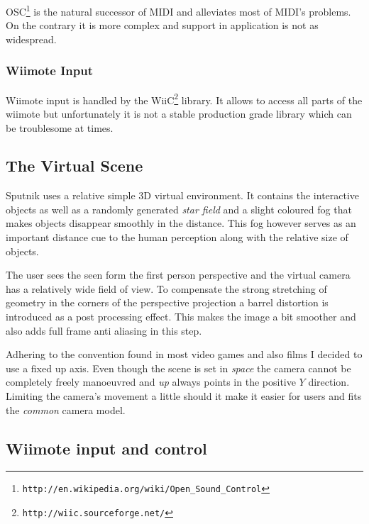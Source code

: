 \documentclass[10pt,a4paper]{scrartcl}
\begin{document}
OSC\footnote{\texttt{http://en.wikipedia.org/wiki/Open\_Sound\_Control}} is the natural successor of MIDI and alleviates most of MIDI's problems. On the contrary it is more complex and support in application is not as widespread.

\subsubsection{Wiimote Input}
Wiimote input is handled by the WiiC\footnote{\texttt{http://wiic.sourceforge.net/}} library. It allows to access all parts of the wiimote but unfortunately it is not a stable production grade library which can be troublesome at times.


\subsection{The Virtual Scene}
Sputnik uses a relative simple 3D virtual environment. It contains the interactive objects as well as a randomly generated \emph{star field} and a slight coloured fog that makes objects disappear smoothly in the distance. This fog however serves as an important distance cue to the human perception along with the relative size of objects. 

The user sees the seen form the first person perspective and the virtual camera has a relatively wide field of view. To compensate the strong stretching of geometry in the corners of the perspective projection a barrel distortion is introduced as a post processing effect. This makes the image a bit smoother and also adds full frame anti aliasing in this step.

Adhering to the convention found in most video games and also films I decided to use a fixed up axis. Even though the scene is set in \emph{space} the camera cannot be completely freely manoeuvred and \emph{up} always points in the positive $Y$ direction. Limiting the camera's movement a little should it make it easier for users and fits the \emph{common} camera model.


\subsection{Wiimote input and control}
\end{document}
